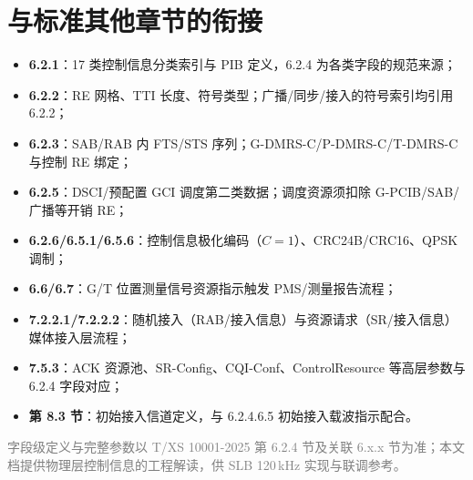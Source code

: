 \documentclass[11pt,a4paper]{ctexart}
\begin{document}
\section{与标准其他章节的衔接}

\begin{itemize}[nosep]
  \item \textbf{6.2.1}：17 类控制信息分类索引与 PIB 定义，6.2.4 为各类字段的规范来源；
  \item \textbf{6.2.2}：RE 网格、TTI 长度、符号类型；广播/同步/接入的符号索引均引用 6.2.2；
  \item \textbf{6.2.3}：SAB/RAB 内 FTS/STS 序列；G-DMRS-C/P-DMRS-C/T-DMRS-C 与控制 RE 绑定；
  \item \textbf{6.2.5}：DSCI/预配置 GCI 调度第二类数据；调度资源须扣除 G-PCIB/SAB/广播等开销 RE；
  \item \textbf{6.2.6/6.5.1/6.5.6}：控制信息极化编码（$C=1$）、CRC24B/CRC16、QPSK 调制；
  \item \textbf{6.6/6.7}：G/T 位置测量信号资源指示触发 PMS/测量报告流程；
  \item \textbf{7.2.2.1/7.2.2.2}：随机接入（RAB/接入信息）与资源请求（SR/接入信息）媒体接入层流程；
  \item \textbf{7.5.3}：ACK 资源池、SR-Config、CQI-Conf、ControlResource 等高层参数与 6.2.4 字段对应；
  \item \textbf{第 8.3 节}：初始接入信道定义，与 6.2.4.6.5 初始接入载波指示配合。
\end{itemize}

\vfill
\begin{center}
\small\textcolor{gray}{字段级定义与完整参数以 T/XS 10001-2025 第 6.2.4 节及关联 6.x.x 节为准；本文档提供物理层控制信息的工程解读，供 SLB 120\,kHz 实现与联调参考。}
\end{center}
\end{document}
